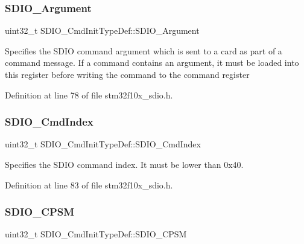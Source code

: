 \subsubsection{\texorpdfstring{S\+D\+I\+O\+\_\+\+Argument}{SDIO\_Argument}}
{\footnotesize\ttfamily uint32\+\_\+t S\+D\+I\+O\+\_\+\+Cmd\+Init\+Type\+Def\+::\+S\+D\+I\+O\+\_\+\+Argument}

Specifies the S\+D\+IO command argument which is sent to a card as part of a command message. If a command contains an argument, it must be loaded into this register before writing the command to the command register 

Definition at line 78 of file stm32f10x\+\_\+sdio.\+h.

\mbox{\label{struct_s_d_i_o___cmd_init_type_def_ab5e1df1f0e8d48a308edfb59a6f80fb4}} 
\subsubsection{\texorpdfstring{S\+D\+I\+O\+\_\+\+Cmd\+Index}{SDIO\_CmdIndex}}
{\footnotesize\ttfamily uint32\+\_\+t S\+D\+I\+O\+\_\+\+Cmd\+Init\+Type\+Def\+::\+S\+D\+I\+O\+\_\+\+Cmd\+Index}

Specifies the S\+D\+IO command index. It must be lower than 0x40. 

Definition at line 83 of file stm32f10x\+\_\+sdio.\+h.

\mbox{\label{struct_s_d_i_o___cmd_init_type_def_ab0e869ae285cc132478dd743c28cd8e2}} 
\subsubsection{\texorpdfstring{S\+D\+I\+O\+\_\+\+C\+P\+SM}{SDIO\_CPSM}}
{\footnotesize\ttfamily uint32\+\_\+t S\+D\+I\+O\+\_\+\+Cmd\+Init\+Type\+Def\+::\+S\+D\+I\+O\+\_\+\+C\+P\+SM}

